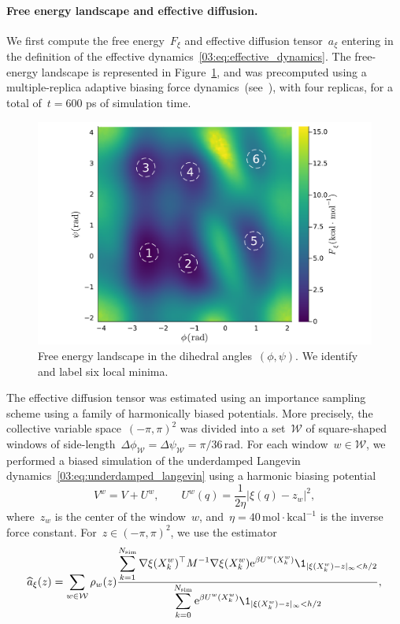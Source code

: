 \paragraph{Free energy landscape and effective diffusion.}
We first compute the free energy~$F_\xi$ and effective diffusion tensor~$a_\xi$ entering in the definition of the effective dynamics~\eqref{03:eq:effective_dynamics}. The free-energy landscape is represented in Figure~\ref{03:fig:pmf}, and was precomputed using a multiple-replica adaptive biasing force dynamics~(see~\cite{CGHLPC15}), with four replicas, for a total of~$t=600$ ps of simulation time.
\begin{figure}
    \center
    \includegraphics[width=0.75\linewidth]{figures/03/shape_optim_diala/pmf.pdf}
    \caption[]{Free energy landscape in the dihedral angles~$(\phi,\psi)$. We identify and label six local minima.}
    \label{03:fig:pmf}
\end{figure}
The effective diffusion tensor was estimated using an importance sampling scheme using a family of harmonically biased potentials.
More precisely, the collective variable space~$(-\pi,\pi)^2$ was divided into a set~$\mathcal W$ of square-shaped windows of side-length~$\Delta\phi_{\mathcal W}=\Delta\psi_{\mathcal W}=\pi/36\,\mathrm{rad}$.
For each window~$w\in\mathcal W$, we performed a biased simulation of the underdamped Langevin dynamics~\eqref{03:eq:underdamped_langevin} using a harmonic biasing potential
\begin{equation}
    \label{03:eq:umbrella_potential}
   V^w = V+U^w,\qquad U^w(q) = \frac1{2\eta}|\xi(q)-z_w|^2,
\end{equation} 
where~$z_w$ is the center of the window~$w$, and~$\eta = 40\,\mathrm{mol}\cdot\mathrm{kcal}^{-1}$ is the inverse force constant.
For~$z\in(-\pi,\pi)^2$, we use the estimator
\begin{equation}
    \label{03:eq:approx_diffusion_tensor}
\widehat{a}_\xi(z) = \sum_{w\in\mathcal W}\rho_w(z)\frac{\displaystyle\sum_{k=1}^{N_{\mathrm{sim}}}\nabla\xi(X_k^w)^\top M^{-1}\nabla\xi(X_k^w)\e^{\beta U^w(X_k^w)}\1_{|\xi(X_k^w)-z|_{\infty}<h/2}}{\displaystyle\sum_{k=0}^{N_{\mathrm{sim}}}\e^{\beta U^w(X_k^w)}\1_{|\xi(X_k^w)-z|_\infty <h/2}},
\end{equation}
